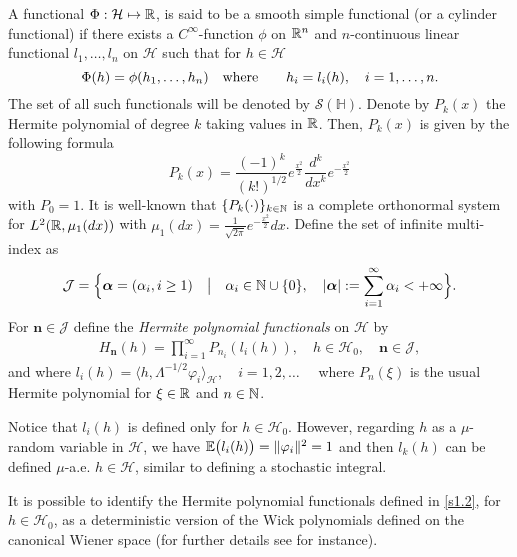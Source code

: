 \documentclass[review,onefignum,onetabnum]{siamart190516}
\begin{document}
        A functional $\Phi:\mathcal{H}\mapsto {\mathbb R}$, is said to be a smooth 
    simple functional (or a cylinder functional) if there exists a
    $C^\infty$-function $\phi$ on ${\mathbb R}^n$ and $n$-continuous linear 
    functional $l_1,\ldots,l_n$ on $\mathcal{H}$ such that for
    $h\in\mathcal{H}$
    \begin{equation}
        \Phi(h)=\phi(h_1,\ldots,h_n)\quad
        \mbox{\rm where}\qquad h_i=l_i(h),\quad i=1,\ldots,n.\label{S1.2}
    \end{equation}
    The set of all such functionals will be denoted by 
    $\mathcal{S}(\mathbb{H})$.
%
    Denote by $P_k(x)$ the Hermite polynomial of degree $k$ taking values in
    ${\mathbb R}$. Then, $P_k(x)$ is given by the following formula
    \[
         P_k(x)=\frac{(-1)^k}{(k!)^{1/2}} e^{\tfrac{x^2}{2}}
         \frac{d^k}{dx^k}e^{-\tfrac{x^2}{2}}
    \]
    with $P_0=1$. It is well-known that $\{P_k(\cdot)\}_{k\in{\mathbb N}}$ is a complete
    orthonormal system for $L^2({\mathbb R},\mu_1(dx))$ with
    $
        \mu_1(dx) =
            \tfrac{1}{\sqrt{2\pi}}
            e^{-\tfrac{x^2}{2}} dx
    $.
    Define the set of infinite multi-index as
    \[
        \mathcal{J} =
            \Big\{ \bm{\alpha} 
                =(\alpha_i,i\ge 1)\quad \big|\quad\alpha_i\in
                {\mathbb N}\cup\{0\},\quad |\bm{\alpha}|
                :=\sum_{i=1}^\infty
                \alpha_i<+\infty  
            \Big\}.
    \]
    For $\bm{n} \in \mathcal{J}$ 
    define the {\it Hermite polynomial functionals}
    on $\mathcal{H}$ by
    \begin{align}
        \label{s1.2}
        H_{\bm{n}}(h) = \prod_{i=1}^\infty P_{n_i}(l_i(h)),\quad
        h \in \mathcal{H}_0, \quad \bm{n} \in \mathcal{J},
    \end{align}
    and where
    $
        l_i(h) = 
        \langle 
            h,  \Lambda^{-1/2} \varphi_i 
        \rangle_\mathcal{H}, \quad
        i=1,2,\ldots \quad
    $
    where $P_n(\xi)$ is the usual Hermite polynomial for  $\xi\in{\mathbb R}$ and
    $n\in{\mathbb N}$.
%
    \begin{remark}
        Notice that $l_i(h)$ is defined only for $h \in\mathcal{H}_0$. However,
        regarding $h$ as a $\mu$-random variable in
        $\mathcal{H}$, we have $\mathbb{E}\big(l_i (h)\big) = \|\varphi_i \|^2  = 1$ and
        then $l_k (h)$ can be defined $\mu$-a.e. $h \in\mathcal{H}$,
        similar to defining a stochastic integral.
    
        It is possible to identify the Hermite polynomial functionals
        defined in \eqref{s1.2}, for $h \in\mathcal{H}_0$, as a deterministic
        version of the Wick polynomials defined on the canonical Wiener 
        space (for further details see \cite{im} for instance).
    \end{remark}
\end{document}
